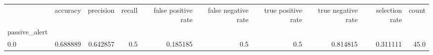 \begin{tabular}{lrrrrrrrrr}
\toprule
{} &  accuracy &  precision &  recall &  false positive rate &  false negative rate &  true positive rate &  true negative rate &  selection rate &  count \\
passive\_alert &           &            &         &                      &                      &                     &                     &                 &        \\
\midrule
0.0           &  0.688889 &   0.642857 &     0.5 &             0.185185 &                  0.5 &                 0.5 &            0.814815 &        0.311111 &   45.0 \\
\bottomrule
\end{tabular}
